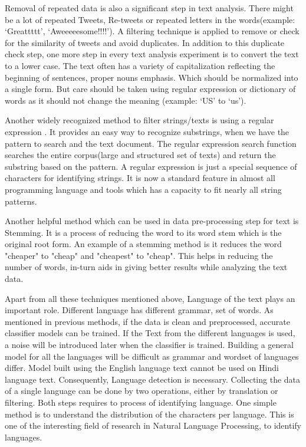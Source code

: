 Removal of repeated data is also a significant step in text analysis. There might be a lot of repeated Tweets, Re-tweets or repeated letters in the words(example: `Greattttt', `Aweeeeesome!!!!'). A filtering technique is applied to remove or check for the similarity of tweets and avoid duplicates. In addition to this duplicate check step, one more step in every text analysis experiment is to convert the text to a lower case. The text often has a variety of capitalization reflecting the beginning of sentences, proper nouns emphasis. Which should be normalized into a single form. But care should be taken using regular expression or dictionary of words as it should not change the meaning (example: `US' to `us').

Another widely recognized method to filter strings/texts is using a regular expression \cite{Thompson}. It provides an easy way to recognize substrings, when we have the pattern to search and the text document. The regular expression search function searches the entire corpus(large and structured set of texts) and return the substring based on the pattern. A regular expression is just a special sequence of characters for identifying strings. It is now a standard feature in almost all programming language and tools which has a capacity to fit nearly all string patterns.   

Another helpful method which can be used in data pre-processing step for text is Stemming. It is a process of reducing the word to its word stem which is the original root form. An example of a stemming method is it reduces the word "cheaper" to "cheap" and "cheapest" to "cheap". This helps in reducing the number of words, in-turn aids in giving better results while analyzing the text data.

Apart from all these techniques mentioned above, Language of the text plays an important role. Different language has different grammar, set of words. As mentioned in previous methods, if the data is clean and preprocessed, accurate classifier models can be trained. If the Text from the different languages is used, a noise will be introduced later when the classifier is trained. Building a general model for all the languages will be difficult as grammar and wordset of languages differ. Model built using the English language text cannot be used on Hindi language text. Consequently, Language detection is necessary. Collecting the data of a single language can be done by two operations, either by translation or filtering. Both steps requires to process of identifying language. One simple method is to understand the distribution of the characters per language. This is one of the interesting field of research in Natural Language Processing, to identify languages. 

